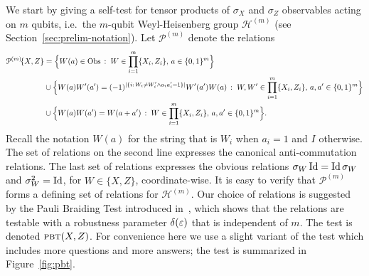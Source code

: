 We start by giving a self-test for tensor products of $\sigma_X$ and $\sigma_Z$ 
observables acting on $m$ qubits, i.e.\ the $m$-qubit Weyl-Heisenberg group $\mathcal{H}^{(m)}$ (see Section~\ref{sec:prelim-notation}). 
Let $\mathcal{P}^{(m)}$ denote the relations  
\begin{align*}
\mathcal{P}^{(m)}\!\{X,Z\} &= \Big\{ W(a)\in\mathrm{Obs}\,: \;W \in \prod_{i=1}^m \{X_i,Z_i\},\,a\in\{0,1\}^m\Big\}\\
&\cup \Big\{W(a)W'(a')=(-1)^{|\{i:\,W_i\neq W'_i \wedge a_ia'_i=1\}|} W'(a')W(a)\,:\;W,W' \in \prod_{i=1}^m \{X_i,Z_i\},\, a,a'\in\{0,1\}^m\Big\}\\
& \cup\Big\{ W(a)W(a')=W(a+a')\,:\;W \in \prod_{i=1}^m \{X_i,Z_i\},\, a,a'\in\{0,1\}^m\Big\}.
\end{align*}
Recall the notation $W(a)$ for the string that is $W_i$ when $a_i=1$ and $I$ otherwise. 
The set of relations on the second line expresses the canonical anti-commutation relations. The last set of relations expresses the obvious relations $\sigma_W \mathop{\rm Id}\nolimits = \mathop{\rm Id}\nolimits \sigma_W$ and $\sigma_W^2 = \mathop{\rm Id}\nolimits$, for $W\in\{X,Z\}$, coordinate-wise. It is easy to verify that $\mathcal{P}^{(m)}$ forms a defining set of relations for $\mathcal{H}^{(m)}$. Our choice of relations is suggested by the Pauli Braiding Test introduced in~\cite{natarajan2016robust}, which shows that the relations are testable with a robustness parameter $\delta(\varepsilon)$ that is independent of $m$. 
The  test is denoted $\textsc{pbt}(X,Z)$. For convenience here we use a slight variant of the test which includes more questions and more answers; the test is summarized in Figure~\ref{fig:pbt}. 



